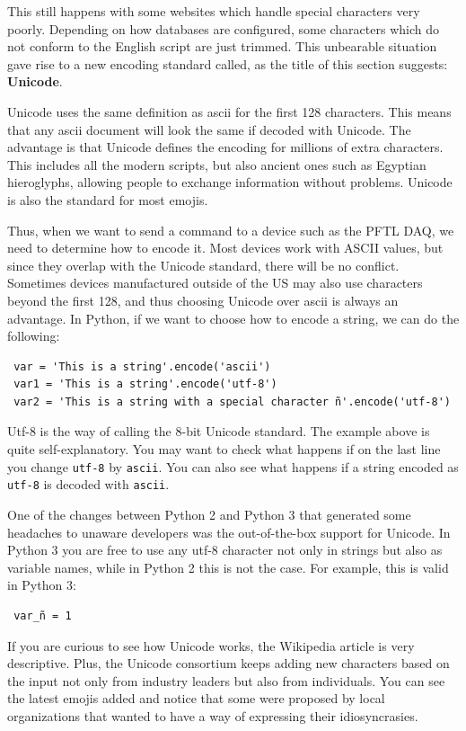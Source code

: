 This still happens with some websites which handle special characters very poorly. Depending on how databases are configured, some characters which do not conform to the English script are just trimmed. This unbearable situation gave rise to a new encoding standard called, as the title of this section suggests: \textbf{Unicode}. 

Unicode uses the same definition as ascii for the first 128 characters. This means that any ascii document will look the same if decoded with Unicode. The advantage is that Unicode defines the encoding for millions of extra characters. This includes all the modern scripts, but also ancient ones such as Egyptian hieroglyphs, allowing people to exchange information without problems. Unicode is also the standard for most emojis.

Thus, when we want to send a command to a device such as the {PFTL DAQ}, we need to determine how to encode it. Most devices work with ASCII values, but since they overlap with the Unicode standard, there will be no conflict. Sometimes devices manufactured outside of the US may also use characters beyond the first 128, and thus choosing Unicode over ascii is always an advantage. In Python, if we want to choose how to encode a string, we can do the following:

\begin{verbatim}
 var = 'This is a string'.encode('ascii')
 var1 = 'This is a string'.encode('utf-8')
 var2 = 'This is a string with a special character ñ'.encode('utf-8')
\end{verbatim}

Utf-8 is the way of calling the 8-bit Unicode standard. The example above is quite self-explanatory. You may want to check what happens if on the last line you change \texttt{utf-8} by \texttt{ascii}. You can also see what happens if a string encoded as \texttt{utf-8} is decoded with \texttt{ascii}. 

One of the changes between Python 2 and Python 3 that generated some headaches to unaware developers was the out-of-the-box support for Unicode. In Python 3 you are free to use any utf-8 character not only in strings but also as variable names, while in Python 2 this is not the case. For example, this is valid in Python 3:

\begin{verbatim}
 var_ñ = 1
\end{verbatim}

If you are curious to see how Unicode works, the Wikipedia article is very descriptive. Plus, the Unicode consortium keeps adding new characters based on the input not only from industry leaders but also from individuals. You can see the latest emojis added and notice that some were proposed by local organizations that wanted to have a way of expressing their idiosyncrasies. 
